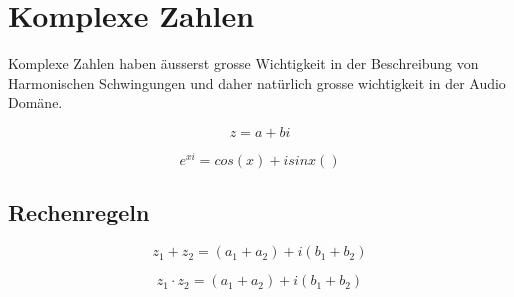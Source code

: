 \chapter{Komplexe Zahlen} \label{chap:complex}


Komplexe Zahlen haben äusserst grosse Wichtigkeit in der Beschreibung von Harmonischen Schwingungen und daher natürlich grosse wichtigkeit in der Audio Domäne.  

\begin{equation}
z = a + bi
\end{equation}


\begin{equation}
e^{xi} = cos(x) + isinx()
\end{equation}

\section{Rechenregeln}
\begin{equation}
z_1 + z_2 = (a_1 + a_2) + i(b_1 + b_2)
\end{equation}

\begin{equation}
z_1 \cdot z_2 = (a_1 + a_2) + i(b_1 + b_2)
\end{equation}
